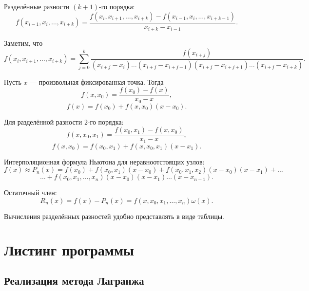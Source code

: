 \documentclass[12pt,a4paper]{article}
\begin{document}
Разделённые разности $(k+1)$-го порядка:
\[
f(x_{i-1},x_i,\ldots,x_{i+k})=
\frac{f(x_i,x_{i+1},\ldots,x_{i+k})-f(x_{i-1},x_i,\ldots,x_{i+k-1})}
{x_{i+k}-x_{i-1}}.
\]

Заметим, что
\[
f(x_i,x_{i+1},\ldots,x_{i+k})=
\sum_{j=0}^{k}
\frac{f(x_{i+j})}
{(x_{i+j}-x_i)\ldots(x_{i+j}-x_{i+j-1})(x_{i+j}-x_{i+j+1})\ldots(x_{i+j}-x_{i+k})}.
\]

Пусть $x$ --- произвольная фиксированная точка. Тогда
\[
f(x,x_0)=\frac{f(x_0)-f(x)}{x_0-x},
\]
\[
f(x)=f(x_0)+f(x,x_0)(x-x_0).
\]

Для разделённой разности 2-го порядка:
\[
f(x,x_0,x_1)=\frac{f(x_0,x_1)-f(x,x_0)}{x_1-x},
\]
\[
f(x,x_0)=f(x_0,x_1)+f(x,x_0,x_1)(x-x_1).
\]

Интерполяционная формула Ньютона для неравноотстоящих узлов:
\[
f(x)\approx P_n(x)=
f(x_0)+f(x_0,x_1)(x-x_0)+
f(x_0,x_1,x_2)(x-x_0)(x-x_1)+\ldots
\]
\[
\ldots+
f(x_0,x_1,\ldots,x_n)(x-x_0)(x-x_1)\ldots(x-x_{n-1}).
\]

Остаточный член:
\[
R_n(x)=f(x)-P_n(x)=f(x,x_0,x_1,\ldots,x_n)\omega(x).
\]

Вычисления разделённых разностей удобно представлять в виде таблицы.


\section{Листинг программы}

\subsection{Реализация метода Лагранжа}
\end{document}
